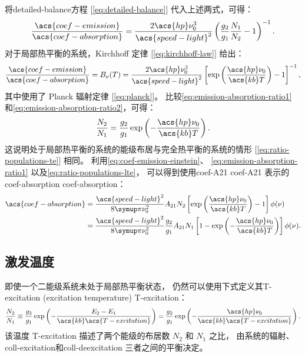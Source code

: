 将\ac{detailed-balance}方程 [\autoref{eq:detailed-balance}]
代入上述两式，可得：
\begin{equation}
  \label{eq:emission-absorption-ratio1}
  \frac{\acs{coef-emission}}{\acs{coef-absorption}}
    = \frac{2 \acs{hp} \nu_0^3}{\acs{speed-light}^2}
      \left( \frac{g_2}{g_1} \frac{N_1}{N_2} - 1 \right)^{-1} .
\end{equation}
对于局部热平衡的系统，Kirchhoff 定律 [\autoref{eq:kirchhoff-law}] 给出：
\begin{equation}
  \label{eq:emission-absorption-ratio2}
  \frac{\acs{coef-emission}}{\acs{coef-absorption}}
    = B_{\nu}(T)
    = \frac{2 \acs{hp} \nu_0^3}{\acs{speed-light}^2} \left[
      \exp\left( \frac{\acs{hp} \nu_0}{\acs{kb} T} \right) - 1 \right]^{-1} ,
\end{equation}
其中使用了 Planck 辐射定律 [\autoref{eq:planck}]。
比较\autoref{eq:emission-absorption-ratio1}
和\autoref{eq:emission-absorption-ratio2}，可得：
\begin{equation}
  \label{eq:ratio-populations-lte}
  \frac{N_2}{N_1}
    = \frac{g_2}{g_1} \exp\left( -\frac{\acs{hp} \nu_0}{\acs{kb} T} \right) .
\end{equation}
这说明处于局部热平衡的系统的能级布居与完全热平衡的系统的情形
[\autoref{eq:ratio-populations-te}] 相同。
利用\autoref{eq:coef-emission-einstein}、
\autoref{eq:emission-absorption-ratio1}
以及\autoref{eq:ratio-populations-lte}，
可以得到使用\acl{coef-A21} \ac{coef-A21}
表示的\acl{coef-absorption} \acs{coef-absorption}：
\begin{align}
  \acs{coef-absorption}
    & = \frac{\acs{speed-light}^2}{8\Cpi \nu_0^2} A_{21} N_2
      \left[ \exp\left( \frac{\acs{hp} \nu_0}{\acs{kb} T} \right) - 1 \right]
      \phi(\nu)
    \label{eq:coef-absorption-einstein2} \\
    & = \frac{\acs{speed-light}^2}{8\Cpi \nu_0^2} \frac{g_2}{g_1} A_{21} N_1
      \left[ 1 - \exp\left( -\frac{\acs{hp} \nu_0}{\acs{kb} T} \right) \right]
      \phi(\nu) .
    \label{eq:coef-absorption-einstein3}
\end{align}

\subsection{激发温度}

即使一个二能级系统未处于局部热平衡状态，
仍然可以使用下式定义其\acl{T-excitation} (excitation temperature)
\ac{T-excitation}：
\begin{equation}
  \label{eq:t-excitation-def}
  \frac{N_2}{N_1} \equiv \frac{g_2}{g_1}
    \exp\left(- \frac{E_2-E_1}{\acs{kb} \acs{T-excitation}} \right)
    = \frac{g_2}{g_1}
      \exp\left( -\frac{\acs{hp} \nu_0}{\acs{kb} \acs{T-excitation}} \right) .
\end{equation}
该温度 \acs{T-excitation} 描述了两个能级的布居数 $N_2$ 和 $N_1$ 之比，
由系统的辐射、\ac{coll-excitation}和\ac{coll-deexcitation} 三者之间的平衡决定。

